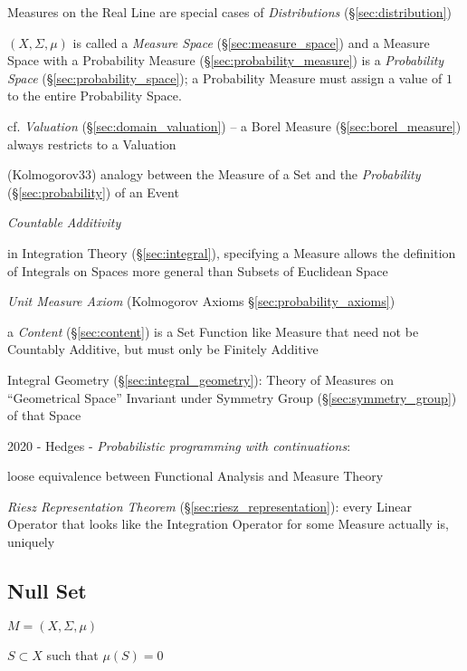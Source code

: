 Measures on the Real Line are special cases of \emph{Distributions}
(\S\ref{sec:distribution})

$(X,\Sigma,\mu)$ is called a \emph{Measure Space} (\S\ref{sec:measure_space})
and a Measure Space with a Probability Measure
(\S\ref{sec:probability_measure}) is a \emph{Probability Space}
(\S\ref{sec:probability_space}); a Probability Measure must assign a value of
$1$ to the entire Probability Space.

\fist cf. \emph{Valuation} (\S\ref{sec:domain_valuation}) -- a Borel Measure
(\S\ref{sec:borel_measure}) always restricts to a Valuation

(Kolmogorov33) analogy between the Measure of a Set and the \emph{Probability}
(\S\ref{sec:probability}) of an Event

\emph{Countable Additivity}

in Integration Theory (\S\ref{sec:integral}), specifying a Measure allows the
definition of Integrals on Spaces more general than Subsets of Euclidean Space

\fist \emph{Unit Measure Axiom} (Kolmogorov Axioms
\S\ref{sec:probability_axioms})

\fist a \emph{Content} (\S\ref{sec:content}) is a Set Function like Measure that
need not be Countably Additive, but must only be Finitely Additive

\fist Integral Geometry (\S\ref{sec:integral_geometry}): Theory of Measures on
``Geometrical Space'' Invariant under Symmetry Group
(\S\ref{sec:symmetry_group}) of that Space

2020 - Hedges - \emph{Probabilistic programming with continuations}:

loose equivalence between Functional Analysis and Measure Theory

\emph{Riesz Representation Theorem} (\S\ref{sec:riesz_representation}): every
Linear Operator that looks like the Integration Operator for some Measure
actually is, uniquely



\subsection{Null Set}\label{sec:null_set}

$M = (X, \Sigma, \mu)$

$S \subset X$ such that $\mu(S) = 0$

